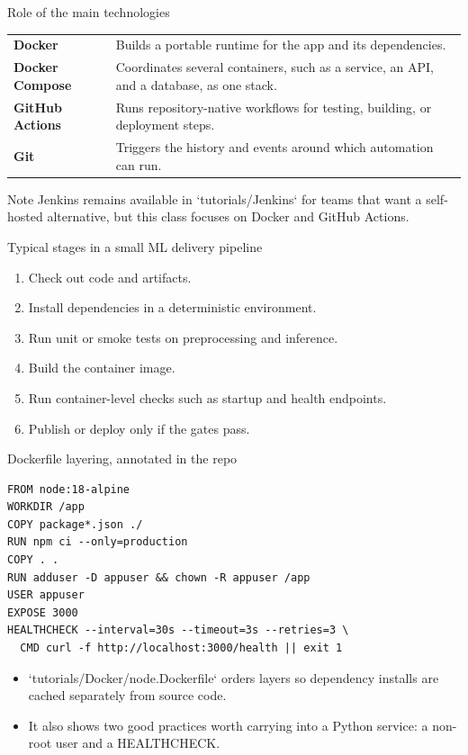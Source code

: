\begin{frame}{Role of the main technologies}
\begin{tabularx}{\textwidth}{>{\bfseries}l X}
Docker & Builds a portable runtime for the app and its dependencies. \\
Docker Compose & Coordinates several containers, such as a service, an API, and a database, as one stack. \\
GitHub Actions & Runs repository-native workflows for testing, building, or deployment steps. \\
Git & Triggers the history and events around which automation can run. \\
\end{tabularx}
\begin{block}{Note}
Jenkins remains available in `tutorials/Jenkins` for teams that want a self-hosted alternative, but this class focuses on Docker and GitHub Actions.
\end{block}
\coursefooter
\end{frame}

\begin{frame}{Typical stages in a small ML delivery pipeline}
\begin{enumerate}
\item Check out code and artifacts.
\item Install dependencies in a deterministic environment.
\item Run unit or smoke tests on preprocessing and inference.
\item Build the container image.
\item Run container-level checks such as startup and health endpoints.
\item Publish or deploy only if the gates pass.
\end{enumerate}
\coursefooter
\end{frame}

\begin{frame}[fragile]{Dockerfile layering, annotated in the repo}
\begin{lstlisting}[style=coursepython]
FROM node:18-alpine
WORKDIR /app
COPY package*.json ./
RUN npm ci --only=production
COPY . .
RUN adduser -D appuser && chown -R appuser /app
USER appuser
EXPOSE 3000
HEALTHCHECK --interval=30s --timeout=3s --retries=3 \
  CMD curl -f http://localhost:3000/health || exit 1
\end{lstlisting}
\begin{itemize}
\item `tutorials/Docker/node.Dockerfile` orders layers so dependency installs are cached separately from source code.
\item It also shows two good practices worth carrying into a Python service: a non-root user and a HEALTHCHECK.
\end{itemize}
\coursefooter
\end{frame}

